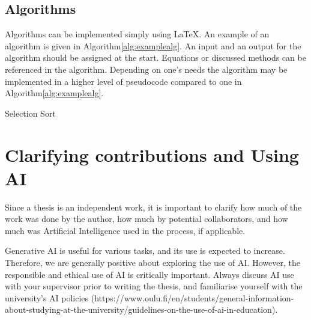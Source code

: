 \DIFdelend \subsection{Algorithms}
Algorithms can be implemented simply using \LaTeX. An example of an
algorithm is given in Algorithm\DIFaddbegin \DIFadd{~}\DIFaddend \ref{alg:examplealg}. An input and an
output for the algorithm should be assigned at the start. Equations
or discussed methods can be referenced in the algorithm. Depending on
one's needs the algorithm may be implemented in a higher level of
pseudocode compared to one in Algorithm\DIFaddbegin \DIFadd{~}\DIFaddend \ref{alg:examplealg}.

\vspace{7mm}
\begin{algorithm}[H]
\DIFdelbegin %
\DIFdelend \SetAlgoLined
\DontPrintSemicolon
{}
\caption{Selection Sort}
\label{alg:examplealg}
\end{algorithm}

\section{Clarifying contributions and Using AI}
\label{AI}
Since a thesis is an independent work, it is important to clarify how
much of the work was done by the author, how much by potential
collaborators, and how much was Artificial Intelligence used in the
process, if applicable.

Generative AI is useful for various tasks, and its use is expected to
increase. Therefore, we are generally positive about exploring the
use of AI. However, the responsible and ethical use of AI is
critically important. Always discuss AI use with your supervisor
prior to writing the thesis, and familiarise yourself with the
university's AI policies
(https://www.oulu.fi/en/students/general-information-about-studying-at-the-university/guidelines-on-the-use-of-ai-in-education).

